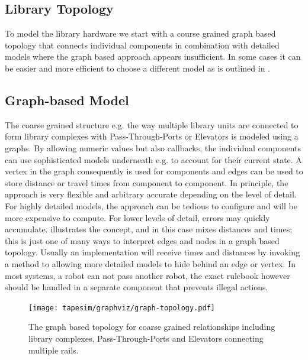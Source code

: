 \documentclass{../../template/esiwace-report}
\begin{document}
\subsection{Library Topology}

To model the library hardware we start with a course grained graph based topology
that connects individual components in combination with detailed models where
the graph based approach appears insufficient.
In some cases it can be easier and more efficient to choose a different model as is outlined in .

\subsection{Graph-based Model}
\label{sec:tape_simple_graph}

The coarse grained structure e.g. the way multiple library units are connected to form library complexes  with Pass-Through-Ports or Elevators is modeled using a graphs.
By allowing numeric values but also callbacks, the individual components can use sophisticated models underneath e.g. to account for their current state.
A vertex in the graph consequently is used for components and edges can be used to store distance or travel times from component to component.
In principle, the approach is very flexible and arbitrary accurate depending on the level of detail.
For highly detailed models, the approach can be tedious to configure and will be more expensive to compute.
For lower levels of detail, errors may quickly accumulate.
 illustrates the concept, and in this case mixes distances and times; this is just one of many ways to interpret edges and nodes in a graph based topology.
Usually an implementation will receive times and distances by invoking a method to allowing more detailed models to hide behind an edge or vertex.
In most systems, a robot can not pass another robot, the exact rulebook however should be handled in a separate component that prevents illegal actions.



\begin{figure}[b]
	\centering
	\texttt{[image: tapesim/graphviz/graph-topology.pdf]} %
	\caption[Example: Graph Topology]{The graph based topology for coarse grained relationships including library complexes, Pass-Through-Ports and Elevators connecting multiple rails.}
	\label{fig:graph topology}
\end{figure}
\end{document}
